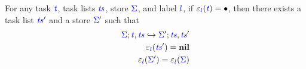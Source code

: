 \documentclass{llncs}
\newcommand{\Varid}[1]{\mathit{#1}}
\begin{document}
\begin{lemma}
  \label{lemma:high-not-blocking}
  For any task \ensuremath{\ifc{\Varid{t}}}, task lists \ensuremath{\ifc{\Varid{ts}}}, store \ensuremath{\ifc{\Sigma}}, and label \ensuremath{\ifc{l}}, if
  $\ensuremath{\varepsilon_{\ifc{l}}(\ifc{\Varid{t}})}=\ensuremath{\bullet}$, then there exists a task list
  \ensuremath{\ifc{\Varid{ts}}'} and a store \ensuremath{\ifc{\Sigma}'} such that
  \begin{align}
  \ensuremath{\ifc{\Sigma};\ifc{\Varid{t}},\ifc{\Varid{ts}}} \ensuremath{\hookrightarrow} \ensuremath{\ifc{\Sigma}';\ifc{\Varid{ts}},\ifc{\Varid{ts}}'} \label{eq:hnb-1} \\
  \ensuremath{\varepsilon_{\ifc{l}}(\ifc{\Varid{ts}}')}=\ensuremath{\mathbf{nil}} \label{eq:hnb-2}\\
  \ensuremath{\varepsilon_{\ifc{l}}(\ifc{\Sigma}')}=\ensuremath{\varepsilon_{\ifc{l}}(\ifc{\Sigma})} \label{eq:hnb-3}
  \end{align}
\end{lemma}
\end{document}
